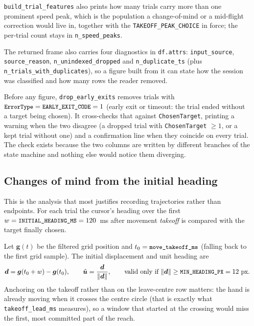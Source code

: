 \documentclass[11pt,a4paper]{article}
\newcommand{\code}[1]{\texttt{\small #1}}
\begin{document}
\code{build\_trial\_features} also prints how many trials carry more than one
prominent speed peak, which is the population a change-of-mind or a mid-flight
correction would live in, together with the \code{TAKEOFF\_PEAK\_CHOICE} in
force; the per-trial count stays in \code{n\_speed\_peaks}.

The returned frame also carries four diagnostics in \code{df.attrs}:
\code{input\_source}, \code{source\_reason}, \code{n\_unindexed\_dropped} and
\code{n\_duplicate\_ts} (plus \code{n\_trials\_with\_duplicates}), so a figure
built from it can state how the session was classified and how many rows the
reader removed.

Before any figure, \code{drop\_early\_exits} removes trials with
$\code{ErrorType} = \code{EARLY\_EXIT\_CODE} = 1$ (early exit or timeout: the
trial ended without a target
being chosen). It cross-checks that against \code{ChosenTarget}, printing a
warning when the two disagree (a dropped trial with \code{ChosenTarget} $\ge 1$,
or a kept trial without one) and a confirmation line when they coincide on every
trial. The check exists because the two columns are written by different
branches of the state machine and nothing else would notice them diverging.

\subsection{Changes of mind from the initial heading}

This is the analysis that most justifies recording trajectories rather than
endpoints. For each trial the cursor's heading over the first
$w = \code{INITIAL\_HEADING\_MS} = 120$~ms after movement \emph{takeoff} is
compared with the target finally chosen.

Let $\bm{g}(t)$ be the filtered grid position and
$t_0 = \code{move\_takeoff\_ms}$ (falling back to the first grid sample). The
initial displacement and unit heading are
\begin{equation}
  \bm{d} = \bm{g}(t_0 + w) - \bm{g}(t_0),
  \qquad
  \hat{\bm{u}} = \frac{\bm{d}}{\|\bm{d}\|},
  \qquad \text{valid only if } \|\bm{d}\| \ge \code{MIN\_HEADING\_PX} = 12\ \text{px}.
  \label{eq:heading}
\end{equation}
Anchoring on the takeoff rather than on the leave-centre row matters: the hand
is already moving when it crosses the centre circle (that is exactly what
\code{takeoff\_lead\_ms} measures), so a window that started at the crossing
would miss the first, most committed part of the reach.
\end{document}
